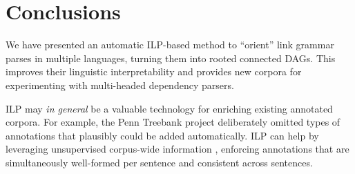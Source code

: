 \documentclass[11pt]{article}
\begin{document}

\section{Conclusions}

We have presented an automatic ILP-based method to ``orient'' link grammar parses in multiple languages, turning them into rooted connected DAGs.  This improves their linguistic interpretability and provides new corpora for experimenting with multi-headed dependency parsers.  

ILP may {\em in general} be a valuable technology for enriching existing annotated corpora.  For example, the Penn Treebank project \cite{TREEBANK-1993} deliberately omitted types of annotations that plausibly could be added automatically.  ILP can help by leveraging unsupervised corpus-wide information \cite{ravi2009}, enforcing annotations that are simultaneously well-formed per sentence and consistent across sentences.

% 
%   
\end{document}
